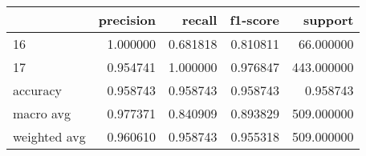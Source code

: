 \begin{tabular}{lrrrr}
\toprule
 & precision & recall & f1-score & support \\
\midrule
16 & 1.000000 & 0.681818 & 0.810811 & 66.000000 \\
17 & 0.954741 & 1.000000 & 0.976847 & 443.000000 \\
accuracy & 0.958743 & 0.958743 & 0.958743 & 0.958743 \\
macro avg & 0.977371 & 0.840909 & 0.893829 & 509.000000 \\
weighted avg & 0.960610 & 0.958743 & 0.955318 & 509.000000 \\
\bottomrule
\end{tabular}

